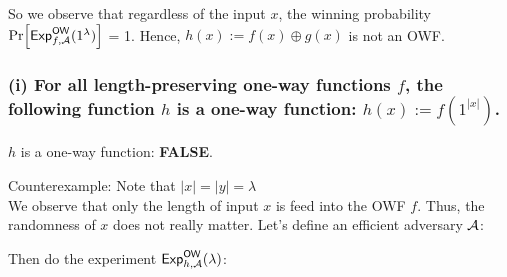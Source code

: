 \begin{center}
\end{center}

So we observe that regardless of the input \(x\), the winning probability
\(\prob{\mathsf{Exp}_{f, \adv}^{\mathsf{OW}}(1^\lambda)}\) = 1. Hence,
\(h(x):= f(x) \oplus g(x)\) is not an OWF.

\subsubsection{(i) For all length-preserving one-way functions \(f\), the following
function \(h\) is a one-way function: \(h(x):=f(1^{|x|})\).}

\(h\) is a one-way function: \textbf{FALSE}.

Counterexample: Note that \(|x|=|y|=\lambda\)\\
We observe that only the length of input \(x\) is feed into the OWF \(f\). Thus, the
randomness of \(x\) does not really matter. Let's define an efficient adversary $\mathcal{A}$:
\begin{center}
\end{center}

Then do the experiment \(\mathsf{Exp}_{h, \mathcal{A}}^{\mathsf{OW}}(\lambda)\):
\begin{center}
\end{center}

